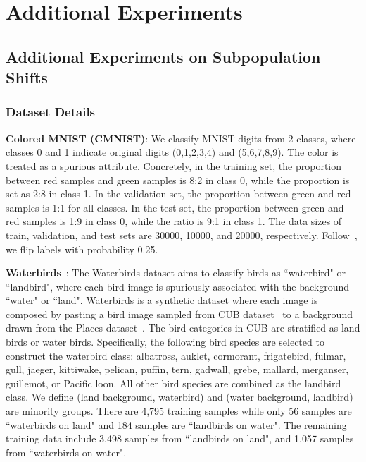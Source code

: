 \appendix
\section{Additional Experiments}
\subsection{Additional Experiments on Subpopulation Shifts}
\subsubsection{Dataset Details}
\label{sec:app_sub_data}

\textbf{Colored MNIST (CMNIST)}: We classify MNIST digits from 2 classes, where classes 0 and 1 indicate original digits (0,1,2,3,4) and (5,6,7,8,9). The color is treated as a spurious attribute. Concretely, in the training set, the proportion between red samples and green samples is 8:2 in class 0, while the proportion is set as 2:8 in class 1. In the validation set, the proportion between green and red samples is 1:1 for all classes. In the test set, the proportion between green and red samples is 1:9 in class 0, while the ratio is 9:1 in class 1. The data sizes of train, validation, and test sets are 30000, 10000, and 20000, respectively. Follow~\cite{arjovsky2019invariant}, we flip labels with probability 0.25.

\textbf{Waterbirds}~\citep{sagawa2019distributionally}: The Waterbirds dataset aims to classify birds as ``waterbird" or ``landbird", where each bird image is spuriously associated with the background ``water" or ``land". 
Waterbirds is a synthetic dataset where each image is composed by pasting a bird image sampled from CUB dataset~\citep{WahCUB_200_2011} to a background drawn from the Places dataset~\cite{zhou2017places}. 
The bird categories in CUB are stratified as land birds or water birds. Specifically, the following bird species are selected to construct the waterbird class: albatross, auklet, cormorant, frigatebird, fulmar, gull, jaeger, kittiwake, pelican, puffin, tern, gadwall, grebe, mallard, merganser, guillemot, or Pacific loon. All other bird species are combined as the landbird class. We define (land background, waterbird) and (water background, landbird) are minority groups. There are 4,795 training samples while only 56 samples are ``waterbirds on land" and 184 samples are ``landbirds on water". The remaining training data include 3,498 samples from ``landbirds on land", and 1,057 samples from ``waterbirds on water".

